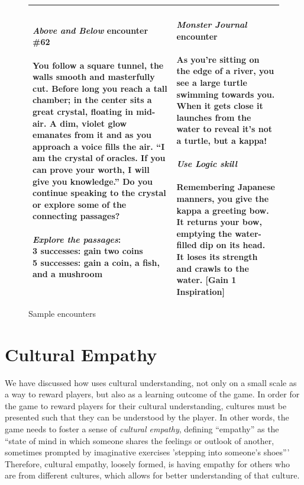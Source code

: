 \documentclass[a4paper]{article}
\begin{document}
\begin{figure}
\begin{tabular}{|p{\colwidth}|p{\colwidth}|}
{\textit{Above and Below} encounter \#62\\
\\
You follow a square tunnel, the walls smooth and masterfully cut.
Before long you reach a tall chamber; in the center sits a great crystal,
floating in mid-air. A dim, violet glow emanates from it and as you approach
a voice fills the air. ``I am the crystal of oracles. If you can prove
your worth, I will give you knowledge.'' Do you continue speaking to the
crystal or explore some of the connecting passages?\\
\\
\textit{Explore the passages}:\\
3 successes: gain two coins\\
5 successes: gain a coin, a fish, and a mushroom
}
& 
\specialcell{
\\
\textit{Monster Journal} encounter\\
\\
As you're sitting on the edge of a river, you see a large turtle swimming towards you. When it gets close it launches from the water to reveal it's not a turtle, but a kappa!\\
\\
\textit{Use Logic skill}\\
\\
Remembering Japanese manners, you give the kappa a greeting bow. It returns your bow, emptying the water-filled dip on its head. It loses its strength and crawls to the water. [Gain 1 Inspiration]
}
\\\hline
\end{tabular}
\caption{Sample encounters}
\label{fig:encounters}
\end{figure}

\section{Cultural Empathy}

We have discussed how \totan{} uses cultural understanding, not only on a
small scale as a way to reward players, but also as a learning outcome of
the game. In order for the game to reward players for their cultural
understanding, cultures must be presented such that they can be understood
by the player. In other words, the game needs to foster a
sense of \textit{cultural empathy}, defining ``empathy'' as 
the ``state of mind in which someone shares the feelings or outlook of
another, sometimes prompted by imaginative exercises 'stepping into
someone's shoes'''~\citep[p.242]{Honderich2005}
Therefore, cultural
empathy, loosely formed, is having empathy for others who are from
different cultures, which allows for better understanding of that
culture.
\end{document}

